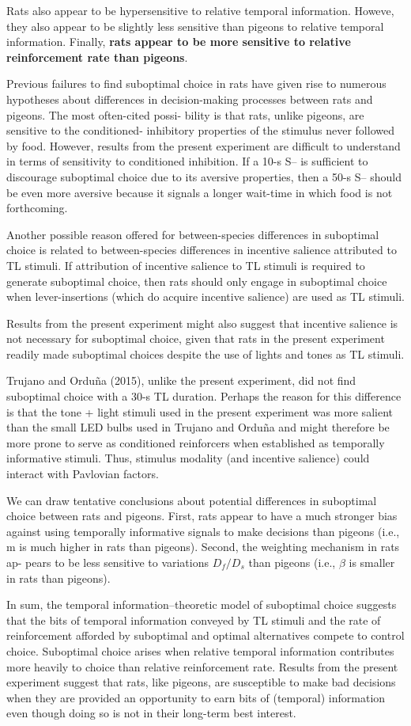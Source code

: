 \documentclass[a4paper,12pt]{article}
\begin{document}
Rats also appear to be hypersensitive to relative temporal information. Howeve, they also appear to be slightly less sensitive than pigeons to relative temporal information. Finally, {\bfseries rats appear to be more sensitive to relative reinforcement rate than pigeons}.

Previous failures to find suboptimal choice in rats have given rise to numerous hypotheses about differences in decision-making processes between rats and pigeons. The most often-cited possi- bility is that rats, unlike pigeons, are sensitive to the conditioned- inhibitory properties of the stimulus never followed by food.
However, results from the present experiment are difficult to understand in terms of sensitivity to conditioned inhibition. If a 10-s S– is sufficient to discourage suboptimal choice due to its aversive properties, then a 50-s S– should be even more aversive because it signals a longer wait-time in which food is not forthcoming.

Another possible reason offered for between-species differences in suboptimal choice is related to between-species differences in incentive salience attributed to TL stimuli. If attribution of incentive salience to TL stimuli is required to generate suboptimal choice, then rats should only engage in suboptimal choice when lever-insertions (which do acquire incentive salience) are used as TL stimuli.

Results from the present experiment might also suggest that incentive salience is not necessary for suboptimal choice, given that rats in the present experiment readily made suboptimal choices despite the use of lights and tones as TL stimuli.

Trujano and Orduña (2015), unlike the present experiment, did not find suboptimal choice with a 30-s TL duration. Perhaps the reason for this difference is that the tone + light stimuli used in the present experiment was more salient than the small LED bulbs used in Trujano and Orduña and might therefore be more prone to serve as conditioned reinforcers when established as temporally informative stimuli. Thus, stimulus modality (and incentive salience) could interact with Pavlovian factors.

We can draw tentative conclusions about potential differences in suboptimal choice between rats and pigeons. First, rats appear to have a much stronger bias against using temporally informative signals to make decisions than pigeons (i.e., m is much higher in rats than pigeons). Second, the weighting mechanism in rats ap- pears to be less sensitive to variations $D_f/D_s$ than pigeons (i.e., $\beta$ is smaller in rats than pigeons). 

In sum, the temporal information–theoretic model of suboptimal choice suggests that the bits of temporal information conveyed by TL stimuli and the rate of reinforcement afforded by suboptimal and optimal alternatives compete to control choice. Suboptimal choice arises when relative temporal information contributes more heavily to choice than relative reinforcement rate. Results from the present experiment suggest that rats, like pigeons, are susceptible to make bad decisions when they are provided an opportunity to earn bits of (temporal) information even though doing so is not in their long-term best interest.
\end{document}
